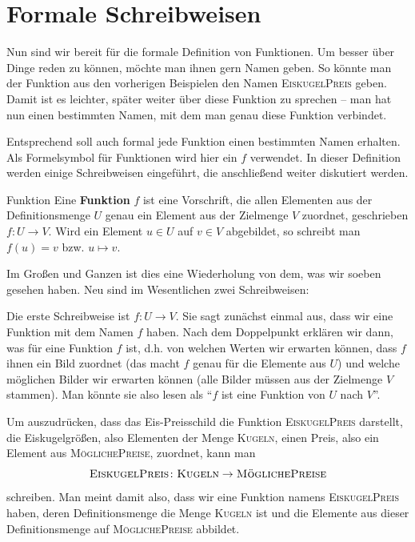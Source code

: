 \documentclass[../../main.tex]{subfiles}
\begin{document}

\section*{Formale Schreibweisen}
\label{sec:abbildungen_definition}
Nun sind wir bereit für die formale Definition von Funktionen. Um besser über Dinge reden zu können, möchte man ihnen gern Namen geben. So könnte man der Funktion aus den vorherigen Beispielen den Namen \textsc{EiskugelPreis} geben. Damit ist es leichter, später weiter über diese Funktion zu sprechen -- man hat nun einen bestimmten Namen, mit dem man genau diese Funktion verbindet.

Entsprechend soll auch formal jede Funktion einen bestimmten Namen erhalten. Als Formelsymbol für Funktionen wird hier ein $f$ verwendet. In dieser Definition werden einige Schreibweisen eingeführt, die anschließend weiter diskutiert werden.

\begin{definition}{Funktion}
Eine \textbf{Funktion} $f$ ist eine Vorschrift, die allen Elementen aus der Definitionsmenge $U$ genau ein Element aus der Zielmenge $V$ zuordnet, geschrieben $f\colon U\rightarrow V$. Wird ein Element $u\in U$ auf $v\in V$ abgebildet, so schreibt man $f(u)=v$ bzw. $u\mapsto v$.
\end{definition}

Im Großen und Ganzen ist dies eine Wiederholung von dem, was wir soeben gesehen haben. Neu sind im Wesentlichen zwei Schreibweisen: 

Die erste Schreibweise ist \mbox{$f\colon U\rightarrow V$}. Sie sagt zunächst einmal aus, dass wir eine Funktion mit dem Namen $f$ haben. Nach dem Doppelpunkt erklären wir dann, was für eine Funktion $f$ ist, d.h. von welchen Werten wir erwarten können, dass $f$ ihnen ein Bild zuordnet (das macht $f$ genau für die Elemente aus $U$) und welche möglichen Bilder wir erwarten können (alle Bilder müssen aus der Zielmenge $V$ stammen). Man könnte sie also lesen als \enquote{$f$ ist eine Funktion von $U$ nach $V$}.

\begin{example}{}
    Um auszudrücken, dass das Eis-Preisschild die Funktion \textsc{EiskugelPreis} darstellt, die Eiskugelgrößen, also Elementen der Menge \textsc{Kugeln}, einen Preis, also ein Element aus \textsc{MöglichePreise}, zuordnet, kann man \[\textsc{EiskugelPreis}\colon\textsc{Kugeln}\rightarrow\textsc{MöglichePreise}\] schreiben. Man meint damit also, dass wir eine Funktion namens \textsc{EiskugelPreis} haben, deren Definitionsmenge die Menge \textsc{Kugeln} ist und die Elemente aus dieser Definitionsmenge auf \textsc{MöglichePreise} abbildet.
\end{example}
\end{document}

